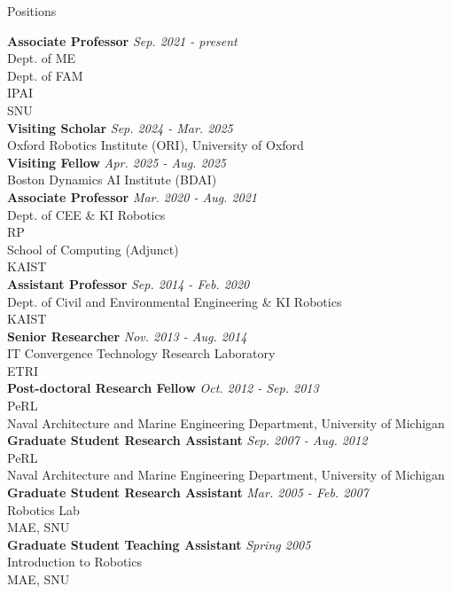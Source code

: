 \begin{rSection}{Positions}

{\bf Associate Professor} \hfill {\em Sep. 2021 - present} \\
Dept. of \ac{ME}\\
Dept. of \ac{FAM}\\
\ac{IPAI}\\
\acf{SNU}\\

{\bf Visiting Scholar} \hfill {\em Sep. 2024 - Mar. 2025} \\
Oxford Robotics Institute (ORI), University of Oxford\\

{\bf Visiting Fellow} \hfill {\em Apr. 2025 - Aug. 2025} \\
Boston Dynamics AI Institute (BDAI)\\

{\bf Associate Professor} \hfill {\em Mar. 2020 - Aug. 2021} \\
Dept. of \ac{CEE} \& KI Robotics\\
\ac{RP}\\
School of Computing (Adjunct)\\
\acf{KAIST}\\

{\bf Assistant Professor} \hfill {\em Sep. 2014 - Feb. 2020} \\
Dept. of Civil and Environmental Engineering \& KI Robotics\\
\acf{KAIST}\\

{\bf Senior Researcher} \hfill {\em Nov. 2013 - Aug. 2014} \\
IT Convergence Technology Research Laboratory\\
\acf{ETRI}\\

{\bf Post-doctoral Research Fellow} \hfill {\em Oct. 2012 - Sep. 2013} \\
\acf{PeRL}\\
Naval Architecture and Marine Engineering Department, University of Michigan\\

{\bf Graduate Student Research Assistant} \hfill {\em Sep. 2007 - Aug. 2012} \\
\acf{PeRL}\\
Naval Architecture and Marine Engineering Department, University of Michigan\\

{\bf Graduate Student Research Assistant} \hfill {\em Mar. 2005 - Feb. 2007} \\
Robotics Lab\\
\acf{MAE}, \acf{SNU}\\

{\bf Graduate Student Teaching Assistant} \hfill {\em Spring 2005} \\
Introduction to Robotics\\
\acf{MAE}, \acf{SNU}\\

\end{rSection}
